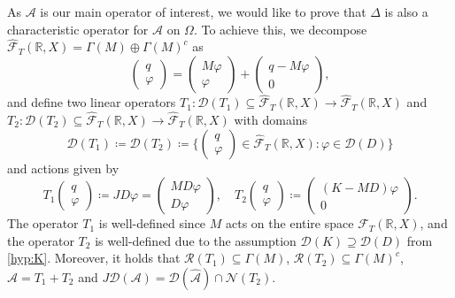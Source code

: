 \documentclass[english]{myarticle}
\begin{document}
\begin{sloppypar}
As $\mathcal{A}$ is our main operator of interest, we would like to prove that $\Delta$ is also a characteristic operator for $\mathcal{A}$ on $\Omega$. To achieve this, we decompose $\hat{\mathcal{F}}_T(\mathbb{R},X) = \Gamma(M) \oplus \Gamma(M)^c$ as
\begin{equation*}
    \begin{pmatrix}
        q \\
        \varphi
    \end{pmatrix}
    =
    \begin{pmatrix}
        M\varphi \\
        \varphi
    \end{pmatrix}
    +
    \begin{pmatrix}
        q - M\varphi \\
        0
    \end{pmatrix},
\end{equation*}
and define two linear operators $T_1 : \mathcal{D}(T_1)  \subseteq \hat{\mathcal{F}}_T(\mathbb{R},X) \to \hat{\mathcal{F}}_T(\mathbb{R},X)$ and $T_2 : \mathcal{D}(T_2) \subseteq \hat{\mathcal{F}}_T(\mathbb{R},X) \to \hat{\mathcal{F}}_T(\mathbb{R},X)$ with domains 
\begin{equation*}
    \mathcal{D}(T_1) \coloneqq \mathcal{D}(T_2) \coloneqq \bigg \{ \begin{pmatrix}
        q \\
        \varphi
    \end{pmatrix} \in \hat{\mathcal{F}}_T(\mathbb{R},X) : \varphi \in \mathcal{D}(D) \bigg \}
\end{equation*}
and actions given by 
\begin{equation} \label{eq:T12action}
 T_1 
    \begin{pmatrix}
        q \\
        \varphi
    \end{pmatrix}
    \coloneqq JD\varphi = \begin{pmatrix}
        MD \varphi \\
        D \varphi
    \end{pmatrix},    
    \quad 
    T_2 
        \begin{pmatrix}
        q \\
        \varphi
    \end{pmatrix}
    \coloneqq
        \begin{pmatrix}
        (K - MD)\varphi \\
        0
    \end{pmatrix}.
\end{equation}
The operator $T_1$ is well-defined since $M$ acts on the entire space $\mathcal{F}_T(\mathbb{R},X)$, and the operator $T_2$ is well-defined due to the assumption $\mathcal{D}(K) \supseteq \mathcal{D}(D)$ from \ref{hyp:K}. Moreover, it holds that $\mathcal{R}(T_1) \subseteq \Gamma(M)$, $\mathcal{R}(T_2) \subseteq \Gamma(M)^c$, 
$\hat{\mathcal{A}} = T_1 + T_2$ and $J \mathcal{D}(\mathcal{A}) = \mathcal{D}(\hat{\mathcal{A}})\cap \mathcal{N} (T_2) $.


\end{sloppypar}
\end{document}
